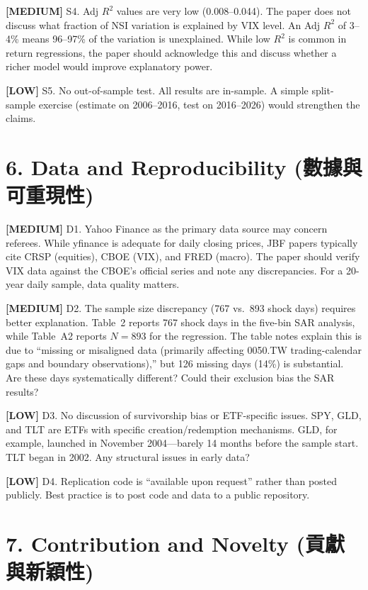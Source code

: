 \documentclass[12pt,a4paper]{article}
\newcommand{\med}[1]{\textcolor{warncolor}{\textbf{[MEDIUM]} #1}}
\newcommand{\low}[1]{\textcolor{okgreen}{\textbf{[LOW]} #1}}
\begin{document}
\med{S4. Adj $R^2$ values are very low (0.008--0.044).} The paper does not discuss what fraction of NSI variation is explained by VIX level. An Adj $R^2$ of 3--4\% means 96--97\% of the variation is unexplained. While low $R^2$ is common in return regressions, the paper should acknowledge this and discuss whether a richer model would improve explanatory power.

\low{S5. No out-of-sample test.} All results are in-sample. A simple split-sample exercise (estimate on 2006--2016, test on 2016--2026) would strengthen the claims.

\section*{6. Data and Reproducibility (數據與可重現性)}

\med{D1. Yahoo Finance as the primary data source may concern referees.} While yfinance is adequate for daily closing prices, JBF papers typically cite CRSP (equities), CBOE (VIX), and FRED (macro). The paper should verify VIX data against the CBOE's official series and note any discrepancies. For a 20-year daily sample, data quality matters.

\med{D2. The sample size discrepancy (767 vs.\ 893 shock days) requires better explanation.} Table~2 reports 767 shock days in the five-bin SAR analysis, while Table~A2 reports $N = 893$ for the regression. The table notes explain this is due to ``missing or misaligned data (primarily affecting 0050.TW trading-calendar gaps and boundary observations),'' but 126 missing days (14\%) is substantial. Are these days systematically different? Could their exclusion bias the SAR results?

\low{D3. No discussion of survivorship bias or ETF-specific issues.} SPY, GLD, and TLT are ETFs with specific creation/redemption mechanisms. GLD, for example, launched in November 2004---barely 14 months before the sample start. TLT began in 2002. Any structural issues in early data?

\low{D4. Replication code is ``available upon request'' rather than posted publicly.} Best practice is to post code and data to a public repository.

\section*{7. Contribution and Novelty (貢獻與新穎性)}
\end{document}
